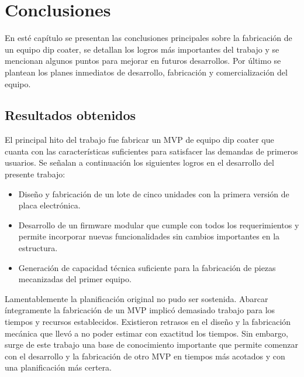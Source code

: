 
\chapter{Conclusiones} %

\label{Chapter5} %



En esté capítulo se presentan las conclusiones principales sobre la fabricación de un equipo dip coater, se detallan los logros más importantes del trabajo y se mencionan algunos puntos para mejorar en futuros desarrollos. Por último se plantean los planes inmediatos de desarrollo, fabricación y comercialización del equipo.

\section{Resultados obtenidos }


El principal hito del trabajo fue fabricar un MVP de equipo dip coater que cuanta con las características suficientes para satisfacer las demandas de primeros usuarios. 
Se señalan a continuación los siguientes logros en el desarrollo del presente trabajo: 
\begin{itemize}
\item Diseño y fabricación de un lote de cinco unidades con la primera versión de placa electrónica.
\item Desarrollo de un firmware modular que cumple con todos los requerimientos y permite incorporar nuevas funcionalidades sin cambios importantes en la estructura.
\item Generación de capacidad técnica suficiente para la fabricación de piezas mecanizadas del primer equipo.  
\end{itemize} 
 

Lamentablemente la planificación original no pudo ser sostenida. Abarcar íntegramente la fabricación de un MVP implicó demasiado trabajo para los tiempos y recursos establecidos. Existieron retrasos en el diseño y la fabricación mecánica que llevó a no poder estimar con exactitud los tiempos. Sin embargo, surge de este trabajo una base de conocimiento importante que permite comenzar con el desarrollo y la fabricación de otro MVP en tiempos más acotados y con una planificación más certera. 


